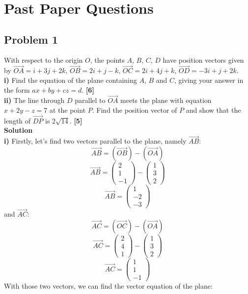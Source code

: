 \documentclass[hidelinks, a4paper, 12pt]{article}
\newcommand{\bd}{\textbf}
\newcommand{\n}{\\[\baselineskip]}
\begin{document}
    \section{Past Paper Questions}
        \subsection{Problem 1}
            With respect to the origin $O$, the points $A$, $B$, $C$, $D$ have position vectors given by $\vec{OA} = i + 3j + 2k$,
            $\vec{OB} = 2i + j - k$, $\vec{OC} = 2i + 4j + k$, $\vec{OD} = -3i + j + 2k$.\n
            \bd{i) }Find the equation of the plane containing $A$, $B$ and $C$, giving your answer in the form $ax + by + cz = d$. \bd{[6]}\n
            \bd{ii) }The line through $D$ parallel to $\vec{OA}$ meets the plane with equation $x + 2y - z = 7$ at the point $P$. Find the
            position vector of $P$ and show that the length of $\vec{DP}$ is $2\sqrt{14}$. \bd{[5]}\n
            \bd{Solution}\n
            \bd{i) }Firstly, let's find two vectors parallel to the plane, namely $\vec{AB}$:
            \[\vec{AB} = (\vec{OB}) - (\vec{OA})\]
            \[\vec{AB} = \begin{pmatrix} 2\\1\\-1 \end{pmatrix} - \begin{pmatrix} 1\\3\\2 \end{pmatrix}\]
            \[\vec{AB} = \begin{pmatrix} 1\\-2\\-3 \end{pmatrix}\]
            and $\vec{AC}$:
            \[\vec{AC} = (\vec{OC}) - (\vec{OA})\]
            \[\vec{AC} = \begin{pmatrix} 2\\4\\1 \end{pmatrix} - \begin{pmatrix} 1\\3\\2 \end{pmatrix}\]
            \[\vec{AC} = \begin{pmatrix} 1\\1\\-1 \end{pmatrix}\]
            With those two vectors, we can find the vector equation of the plane:
\end{document}
